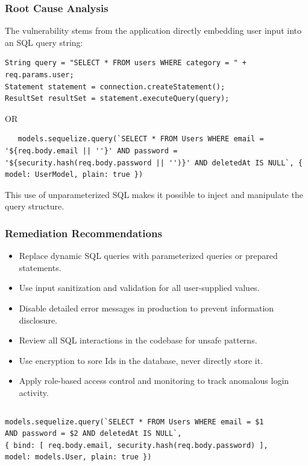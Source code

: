 \documentclass[12pt]{article}
\begin{document}
\subsubsection{Root Cause Analysis}
The vulnerability stems from the application directly embedding user input into an SQL query string:
\begin{lstlisting}
String query = "SELECT * FROM users WHERE category = " + req.params.user;
Statement statement = connection.createStatement();
ResultSet resultSet = statement.executeQuery(query);
\end{lstlisting}
OR
\begin{lstlisting}
   models.sequelize.query(`SELECT * FROM Users WHERE email = '${req.body.email || ''}' AND password = '${security.hash(req.body.password || '')}' AND deletedAt IS NULL`, { model: UserModel, plain: true })
\end{lstlisting}
This use of unparameterized SQL makes it possible to inject and manipulate the query structure.

\subsubsection{Remediation Recommendations}
\begin{itemize}
    \item Replace dynamic SQL queries with parameterized queries or prepared statements.
    \item Use input sanitization and validation for all user-supplied values.
    \item Disable detailed error messages in production to prevent information disclosure.
    \item Review all SQL interactions in the codebase for unsafe patterns.
    \item Use encryption to sore Ids in the database, never directly store it.
    \item Apply role-based access control and monitoring to track anomalous login activity.
    \begin{lstlisting}

\end{lstlisting}
\end{itemize}

\begin{verbatim}
models.sequelize.query(`SELECT * FROM Users WHERE email = $1 
AND password = $2 AND deletedAt IS NULL`, 
{ bind: [ req.body.email, security.hash(req.body.password) ], 
model: models.User, plain: true })
\end{verbatim}
\end{document}
